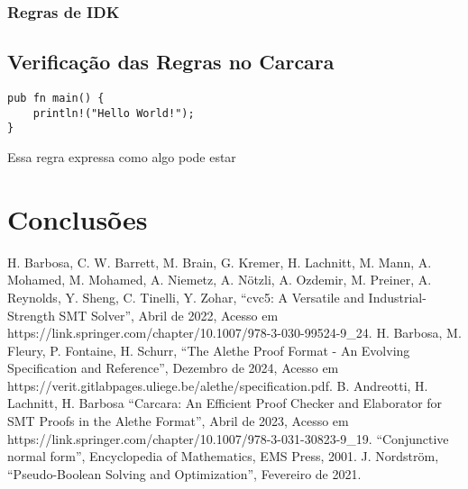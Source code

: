 \documentclass[conference]{IEEEtran}
\begin{document}
\subsubsection{Regras de IDK}

\subsection{Verificação das Regras no Carcara}

\begin{verbatim}
pub fn main() {
    println!("Hello World!");
}
\end{verbatim}

Essa regra expressa como algo pode estar



\section*{Conclusões}

\begin{thebibliography}{00}
              H. Barbosa, C. W. Barrett, M. Brain, G. Kremer, H. Lachnitt, M. Mann, A. Mohamed, M. Mohamed, A. Niemetz, A. Nötzli, A. Ozdemir, M. Preiner, A. Reynolds, Y. Sheng, C. Tinelli, Y. Zohar, ``cvc5: A Versatile and Industrial-Strength SMT Solver'', Abril de 2022, Acesso em https://link.springer.com/chapter/10.1007/978-3-030-99524-9\_24.
            H. Barbosa, M. Fleury, P. Fontaine, H. Schurr, ``The Alethe Proof Format - An Evolving Specification and Reference'', Dezembro de 2024, Acesso em https://verit.gitlabpages.uliege.be/alethe/specification.pdf.
           B. Andreotti, H. Lachnitt, H. Barbosa ``Carcara: An Efficient Proof Checker and Elaborator for SMT Proofs in the Alethe Format'', Abril de 2023, Acesso em https://link.springer.com/chapter/10.1007/978-3-031-30823-9\_19.
               ``Conjunctive normal form'', Encyclopedia of Mathematics, EMS Press, 2001.
           J. Nordström, ``Pseudo-Boolean Solving and Optimization'', Fevereiro de 2021.
\end{thebibliography}
\end{document}
